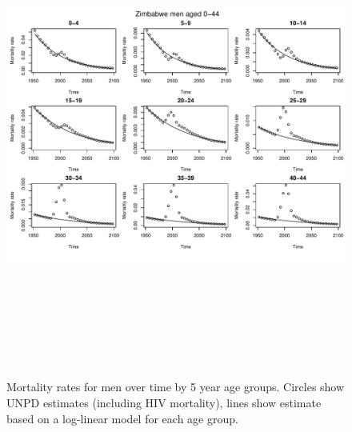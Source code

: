 \documentclass{article}
\begin{document}
\begin{figure}
\includegraphics[width=16cm,height=16cm]{EstimatingRatesFromUNPDv2-MortalityMen1} 

\caption{Mortality rates for men over time by 5 year age groups. Circles show UNPD estimates (including HIV mortality), lines show estimate based on a log-linear model for each age group.}
\label{Mortalitymen1}
\end{figure}
\end{document}
